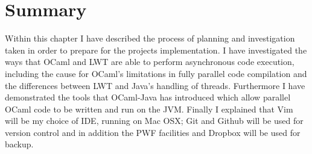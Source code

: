 \documentclass[12pt,twoside,notitlepage]{report}
\begin{document}
\section{Summary}
\label{sec:preparation_summary}
%
%
Within this chapter I have described the process of planning and investigation taken in order to prepare for the projects implementation. I have investigated the ways that OCaml and LWT are able to perform asynchronous code
execution, including the cause for OCaml's limitations in fully parallel code compilation and the differences between LWT and Java's handling of threads. Furthermore I have demonstrated the tools that OCaml-Java has introduced which
allow parallel OCaml code to be written and run on the JVM.  Finally I explained that Vim will be my choice of IDE, running on Mac OSX; Git and Github will be used for version control and in addition the PWF facilities and Dropbox
will be used for backup.
\end{document}
